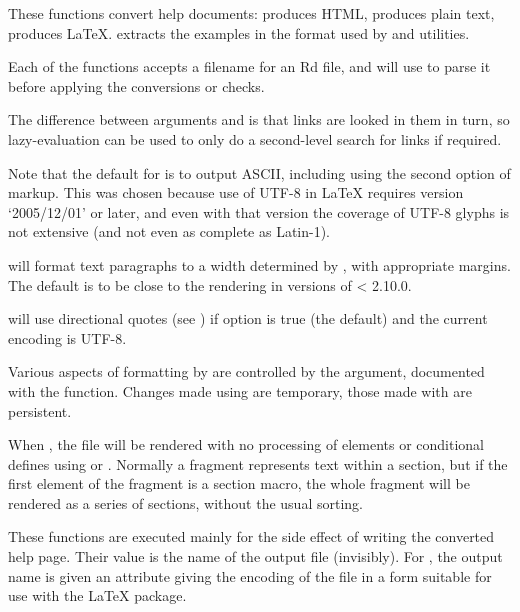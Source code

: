 \begin{Details}\relax
These functions convert help documents:  produces HTML,
 produces plain text,  produces LaTeX.
 extracts the examples in the format used by
 and \R{} utilities.

Each of the functions accepts a filename for an Rd file, and
will use  to parse it before applying the
conversions or checks.

The difference between arguments  and  is that
links are looked in them in turn, so lazy-evaluation can be used to
only do a second-level search for links if required.

Note that the default for  is to output ASCII,
including using the second option of  markup.  This was
chosen because use of UTF-8 in LaTeX requires version
`2005/12/01' or later, and even with that version the coverage
of UTF-8 glyphs is not extensive (and not even as complete as
Latin-1).

 will format text paragraphs to a width determined by
, with appropriate margins.  The default is to be close to
the rendering in versions of \R{} < 2.10.0.

 will use directional quotes (see )
if option  is true (the default) and
the current encoding is UTF-8.

Various aspects of formatting by  are controlled by the
 argument, documented with the 
function. Changes made using  are temporary, those
made with  are persistent.

When , the  file will be rendered
with no processing of  elements or conditional defines
using  or .  Normally a fragment represents
text within a section, but if the first element of the fragment
is a section macro, the whole fragment will be rendered as 
a series of sections, without the usual sorting.
\end{Details}
%
\begin{Value}
These functions are executed mainly for the side effect of
writing the converted help page.  Their value is the name of the output
file (invisibly).  For , the output name is given an
attribute  giving the encoding of the file in a
form suitable for use with the LaTeX  package.
\end{Value}
